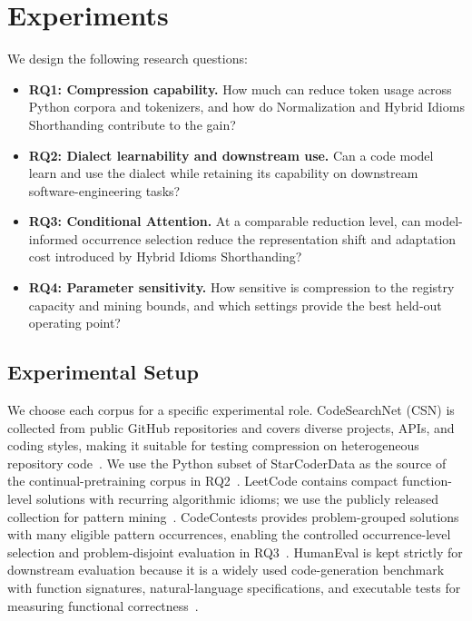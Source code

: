 
\section{Experiments}
\label{sec:experiments}

We design the following research questions:

\begin{itemize}[leftmargin=*]
    \item \textbf{RQ1: Compression capability.} How much can \tool reduce token usage across Python corpora and tokenizers, and how do Normalization and Hybrid Idioms Shorthanding contribute to the gain?
    \item \textbf{RQ2: Dialect learnability and downstream use.} Can a code model learn and use the \tool dialect while retaining its capability on downstream software-engineering tasks?
    \item \textbf{RQ3: Conditional Attention.} At a comparable reduction level, can model-informed occurrence selection reduce the representation shift and adaptation cost introduced by Hybrid Idioms Shorthanding?
    \item \textbf{RQ4: Parameter sensitivity.} How sensitive is compression to the registry capacity and mining bounds, and which settings provide the best held-out operating point?
\end{itemize}

\subsection{Experimental Setup}
\label{subsec:data_setup}

We choose each corpus for a specific experimental role. CodeSearchNet (CSN) is collected from public GitHub repositories and covers diverse projects, APIs, and coding styles, making it suitable for testing compression on heterogeneous repository code~\cite{husain2019codesearchnet}. We use the Python subset of StarCoderData as the source of the continual-pretraining corpus in RQ2~\cite{starcoder2023,zhensuuu2024starcoderdata}. LeetCode contains compact function-level solutions with recurring algorithmic idioms; we use the publicly released  collection for pattern mining~\cite{limyeri2024leetcode}. CodeContests provides problem-grouped solutions with many eligible pattern occurrences, enabling the controlled occurrence-level selection and problem-disjoint evaluation in RQ3~\cite{codecontests2022}. HumanEval is kept strictly for downstream evaluation because it is a widely used code-generation benchmark with function signatures, natural-language specifications, and executable tests for measuring functional correctness~\cite{chen2021codex}.

